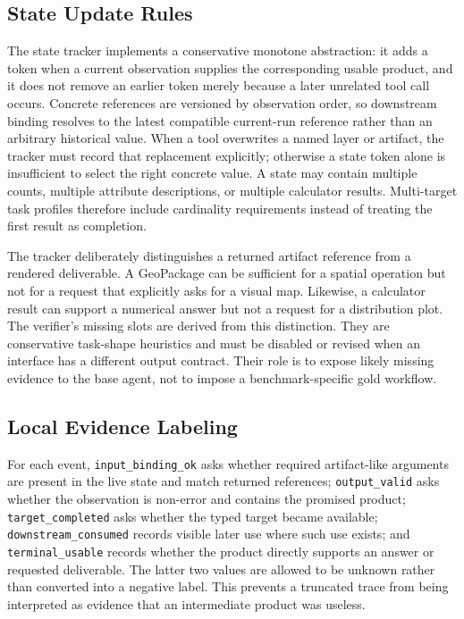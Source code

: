 \documentclass[10pt]{article}
\begin{document}
\subsection{State Update Rules}
The state tracker implements a conservative monotone abstraction: it adds a token when a current observation supplies the corresponding usable product, and it does not remove an earlier token merely because a later unrelated tool call occurs. Concrete references are versioned by observation order, so downstream binding resolves to the latest compatible current-run reference rather than an arbitrary historical value. When a tool overwrites a named layer or artifact, the tracker must record that replacement explicitly; otherwise a state token alone is insufficient to select the right concrete value. A state may contain multiple counts, multiple attribute descriptions, or multiple calculator results. Multi-target task profiles therefore include cardinality requirements instead of treating the first result as completion.

The tracker deliberately distinguishes a returned artifact reference from a rendered deliverable. A GeoPackage can be sufficient for a spatial operation but not for a request that explicitly asks for a visual map. Likewise, a calculator result can support a numerical answer but not a request for a distribution plot. The verifier's missing slots are derived from this distinction. They are conservative task-shape heuristics and must be disabled or revised when an interface has a different output contract. Their role is to expose likely missing evidence to the base agent, not to impose a benchmark-specific gold workflow.

\subsection{Local Evidence Labeling}
For each event, \texttt{input\_binding\_ok} asks whether required artifact-like arguments are present in the live state and match returned references; \texttt{output\_valid} asks whether the observation is non-error and contains the promised product; \texttt{target\_completed} asks whether the typed target became available; \texttt{downstream\_consumed} records visible later use where such use exists; and \texttt{terminal\_usable} records whether the product directly supports an answer or requested deliverable. The latter two values are allowed to be unknown rather than converted into a negative label. This prevents a truncated trace from being interpreted as evidence that an intermediate product was useless.
\end{document}
